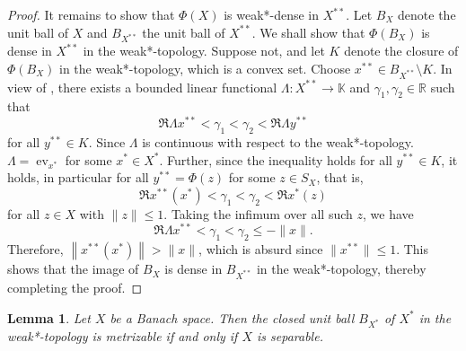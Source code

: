 \documentclass[11pt]{article}
\theoremstyle{thmstyle}
\newtheorem{lemma}[theorem]{Lemma}
\theoremstyle{defstyle}
\newcommand{\R}{\mathbb{R}}
\newcommand{\bbC}{\mathbb{C}}
\newcommand{\K}{\mathbb{K}} %
\newcommand{\ev}{\operatorname{ev}}
\renewcommand{\le}{\leqslant}
\begin{document}
\begin{proof}
    It remains to show that $\Phi(X)$ is weak*-dense in $X^{\ast\ast}$. Let $B_X$ denote the unit ball of $X$ and $B_{X^{\ast\ast}}$ the unit ball of $X^{\ast\ast}$. We shall show that $\Phi(B_X)$ is dense in $X^{\ast\ast}$ in the weak*-topology. Suppose not, and let $K$ denote the closure of $\Phi(B_X)$ in the weak*-topology, which is a convex set. Choose $x^{\ast\ast}\in B_{X^{\ast\ast}}\setminus K$. In view of , there exists a bounded linear functional $\Lambda\colon X^{\ast\ast}\to\K$ and $\gamma_1,\gamma_2\in\R$ such that 
    \begin{equation*}
        \Re\Lambda x^{\ast\ast} < \gamma_1 < \gamma_2 < \Re\Lambda y^{\ast\ast}
    \end{equation*}
    for all $y^{\ast\ast}\in K$. Since $\Lambda$ is continuous with respect to the weak*-topology. $\Lambda = \ev_{x^\ast}$ for some $x^\ast\in X^{\ast}$. Further, since the inequality holds for all $y^{\ast\ast}\in K$, it holds, in particular for all $y^{\ast\ast} = \Phi(z)$ for some $z\in S_X$, that is, 
    \begin{equation*}
        \Re x^{\ast\ast}(x^\ast) < \gamma_1 < \gamma_2 < \Re x^{\ast}(z)
    \end{equation*}
    for all $z\in X$ with $\|z\|\le 1$. Taking the infimum over all such $z$, we have 
    \begin{equation*}
        \Re\Lambda x^{\ast\ast} < \gamma_1 < \gamma_2\le -\|x\|.
    \end{equation*}
    Therefore, $\left\|x^{\ast\ast}(x^\ast)\right\| > \|x\|$, which is absurd since $\|x^{\ast\ast}\| \le 1$. This shows that the image of $B_X$ is dense in $B_{X^{\ast\ast}}$ in the weak*-topology, thereby completing the proof.
\end{proof}

\begin{lemma}
    Let $X$ be a Banach space. Then the closed unit ball $B_{X^\ast}$ of $X^{\ast}$ in the weak*-topology is metrizable if and only if $X$ is separable.
\end{lemma}
\end{document}
